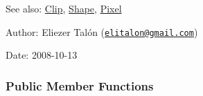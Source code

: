 \begin{Desc}
\item[See also:]\hyperlink{class_clip}{Clip}, \hyperlink{class_shape}{Shape}, \hyperlink{_shape_8hpp_535e59456e3e633842529cfa8ea103c4}{Pixel}\end{Desc}
\begin{Desc}
\item[Author:]Eliezer Talón (\href{mailto:elitalon@gmail.com}{\tt elitalon@gmail.com}) \end{Desc}
\begin{Desc}
\item[Date:]2008-10-13 \end{Desc}
\subsubsection*{Public Member Functions}
